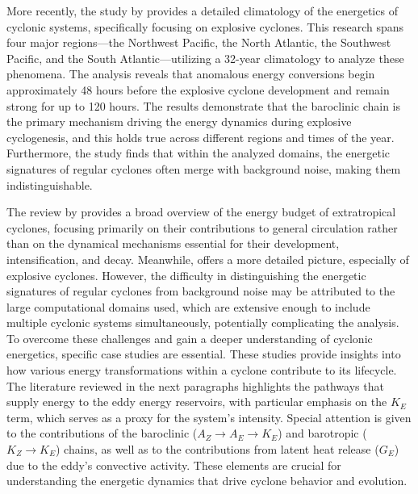 More recently, the study by \citet{black2013universal} provides a detailed climatology of the energetics of cyclonic systems, specifically focusing on explosive cyclones. This research spans four major regions—the Northwest Pacific, the North Atlantic, the Southwest Pacific, and the South Atlantic—utilizing a 32-year climatology to analyze these phenomena. The analysis reveals that anomalous energy conversions begin approximately 48 hours before the explosive cyclone development and remain strong for up to 120 hours. The results demonstrate that the baroclinic chain is the primary mechanism driving the energy dynamics during explosive cyclogenesis, and this holds true across different regions and times of the year. Furthermore, the study finds that within the analyzed domains, the energetic signatures of regular cyclones often merge with background noise, making them indistinguishable.

The review by \citet{smith1980energetics} provides a broad overview of the energy budget of extratropical cyclones, focusing primarily on their contributions to general circulation rather than on the dynamical mechanisms essential for their development, intensification, and decay. Meanwhile, \citet{black2013universal} offers a more detailed picture, especially of explosive cyclones. However, the difficulty in distinguishing the energetic signatures of regular cyclones from background noise may be attributed to the large computational domains used, which are extensive enough to include multiple cyclonic systems simultaneously, potentially complicating the analysis. To overcome these challenges and gain a deeper understanding of cyclonic energetics, specific case studies are essential. These studies provide insights into how various energy transformations within a cyclone contribute to its lifecycle. The literature reviewed in the next paragraphs highlights the pathways that supply energy to the eddy energy reservoirs, with particular emphasis on the \(K_E\) term, which serves as a proxy for the system's intensity. Special attention is given to the contributions of the baroclinic (\(A_Z \rightarrow A_E \rightarrow K_E\)) and barotropic (\(K_Z \rightarrow K_E\)) chains, as well as to the contributions from latent heat release (\(G_E\)) due to the eddy's convective activity. These elements are crucial for understanding the energetic dynamics that drive cyclone behavior and evolution.


